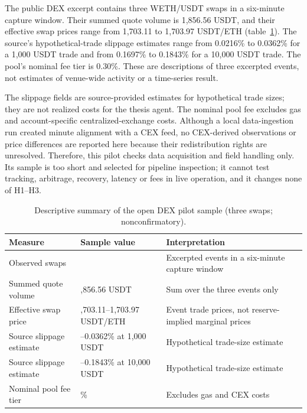 The public DEX excerpt contains three WETH/USDT swaps in a six-minute capture window. Their summed quote volume is 1,856.56 USDT, and their effective swap prices range from 1,703.11 to 1,703.97 USDT/ETH (table~\ref{tab:dex-pilot}). The source's hypothetical-trade slippage estimates range from 0.0216\% to 0.0362\% for a 1,000 USDT trade and from 0.1697\% to 0.1843\% for a 10,000 USDT trade. The pool's nominal fee tier is 0.30\%. These are descriptions of three excerpted events, not estimates of venue-wide activity or a time-series result.

The slippage fields are source-provided estimates for hypothetical trade sizes; they are not realized costs for the thesis agent. The nominal pool fee excludes gas and account-specific centralized-exchange costs. Although a local data-ingestion run created minute alignment with a CEX feed, no CEX-derived observations or price differences are reported here because their redistribution rights are unresolved. Therefore, this pilot checks data acquisition and field handling only. Its sample is too short and selected for pipeline inspection; it cannot test tracking, arbitrage, recovery, latency or fees in live operation, and it changes none of H1--H3.

\begin{table}[htbp]
\centering
\caption{Descriptive summary of the open DEX pilot sample (three swaps; nonconfirmatory).}
\label{tab:dex-pilot}
\small
\begin{tabularx}{\textwidth}{@{}>{\raggedright\arraybackslash}p{}>{\raggedright\arraybackslash}p{}X@{}}
\toprule
Measure & Sample value & Interpretation \\
\midrule
Observed swaps & 3 & Excerpted events in a six-minute capture window \\
Summed quote volume & 1,856.56 USDT & Sum over the three events only \\
Effective swap price & 1,703.11--1,703.97 USDT/ETH & Event trade prices, not reserve-implied marginal prices \\
Source slippage estimate & 0.0216--0.0362\% at 1,000 USDT & Hypothetical trade-size estimate \\
Source slippage estimate & 0.1697--0.1843\% at 10,000 USDT & Hypothetical trade-size estimate \\
Nominal pool fee tier & 0.30\% & Excludes gas and CEX costs \\
\bottomrule
\end{tabularx}
\end{table}

